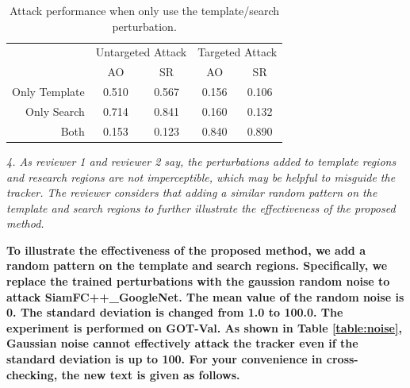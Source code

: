 \documentclass[12pt]{article}
\begin{document}
\begin{table}[]
  \renewcommand\thetable{XI}
  \centering
  \caption{Attack performance when only use the template/search perturbation.}
  \label{table:one_branch}
  \begin{tabular}{@{}rcccc@{}}
  \toprule
                & \multicolumn{2}{c}{Untargeted Attack} & \multicolumn{2}{c}{Targeted Attack} \\ \cmidrule{2-5}
                & AO                & SR                & AO               & SR               \\ \midrule
  Only Template & 0.510             & 0.567             & 0.156            & 0.106            \\
  Only Search   & 0.714             & 0.841             & 0.160            & 0.132            \\
  Both          & 0.153             & 0.123             & 0.840            & 0.890            \\
  \bottomrule
  \end{tabular}
\end{table}

\textit{4. As reviewer 1 and reviewer 2 say, the perturbations added to template regions and research regions are not imperceptible, which may be helpful to misguide the tracker. The reviewer considers that adding a similar random pattern on the template and search regions to further illustrate the effectiveness of the proposed method.}

\textbf{To illustrate the effectiveness of the proposed method, we add a random pattern on the template and search regions. 
Specifically, we replace the trained perturbations with the gaussion random noise to attack SiamFC++\_GoogleNet. The mean value of the random noise is 0. The standard deviation is changed from 1.0 to 100.0. The experiment is performed on GOT-Val.
As shown in Table \ref{table:noise}, Gaussian noise cannot effectively attack the tracker even if the standard deviation is up to 100.
For your convenience in cross-checking, the new text is given as follows.
}
\end{document}
